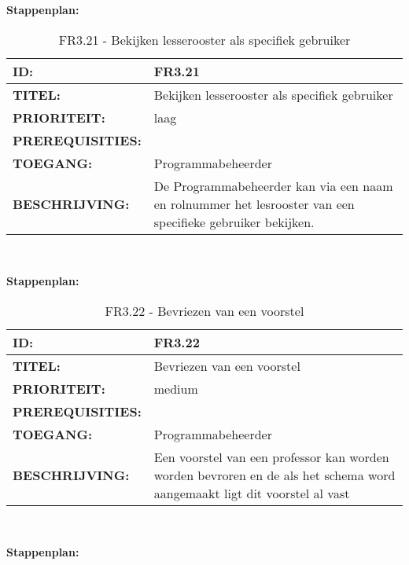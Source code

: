 \textbf{Stappenplan:}

\noindent\begin{table}[H]
            \begin{tabular}{l | p{10cm}}
                \textbf{ID:} & FR3.21 \\ \hline
                \textbf{TITEL:} & Bekijken lesserooster als specifiek gebruiker\\ \hline
                \textbf{PRIORITEIT:} &  laag \\ \hline
                \textbf{PREREQUISITIES:} & \\ \hline
                \textbf{TOEGANG:} & Programmabeheerder \\ \hline
                \textbf{BESCHRIJVING:} & De Programmabeheerder kan via een naam en rolnummer het lesrooster van een specifieke gebruiker bekijken. \\ 
            \end{tabular}\\
            \caption{FR3.21 - Bekijken lesserooster als specifiek gebruiker}
            \label{tab:FR3.21 - Bekijken lesserooster als specifiek gebruiker}
        \end{table}
        
\textbf{Stappenplan:}        
        
\noindent\begin{table}[H]
            \begin{tabular}{l | p{10cm}}
                \textbf{ID:} & FR3.22 \\ \hline
                \textbf{TITEL:} & Bevriezen van een voorstel\\ \hline
                \textbf{PRIORITEIT:} &  medium \\ \hline
                \textbf{PREREQUISITIES:} & \\ \hline
                \textbf{TOEGANG:} & Programmabeheerder \\ \hline
                \textbf{BESCHRIJVING:} & Een voorstel van een professor kan worden worden bevroren en de als het schema word aangemaakt ligt dit voorstel al vast\\ 
            \end{tabular}\\
            \caption{FR3.22 - Bevriezen van een voorstel}
            \label{tab:FR3.22 - Bevriezen van een voorstel}
        \end{table}
        
\textbf{Stappenplan:}
        

